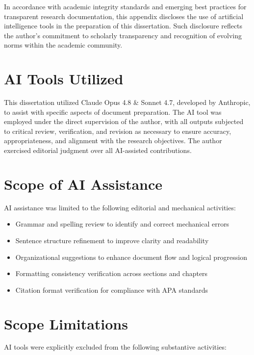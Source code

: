 


In accordance with academic integrity standards and emerging best practices for transparent research documentation, this appendix discloses the use of artificial intelligence tools in the preparation of this dissertation. Such disclosure reflects the author's commitment to scholarly transparency and recognition of evolving norms within the academic community.

\section{AI Tools Utilized}

This dissertation utilized Claude Opus 4.8 \& Sonnet 4.7, developed by Anthropic, to assist with specific aspects of document preparation. The AI tool was employed under the direct supervision of the author, with all outputs subjected to critical review, verification, and revision as necessary to ensure accuracy, appropriateness, and alignment with the research objectives. The author exercised editorial judgment over all AI-assisted contributions.

\section{Scope of AI Assistance}

AI assistance was limited to the following editorial and mechanical activities:

\begin{itemize}
    \item Grammar and spelling review to identify and correct mechanical errors
    \item Sentence structure refinement to improve clarity and readability
    \item Organizational suggestions to enhance document flow and logical progression
    \item Formatting consistency verification across sections and chapters
    \item Citation format verification for compliance with APA standards
\end{itemize}

\section{Scope Limitations}

AI tools were explicitly excluded from the following substantive activities:

